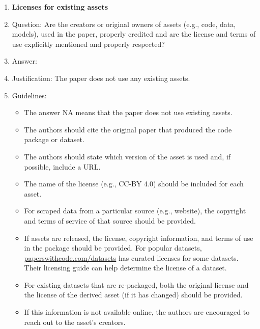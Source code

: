 \begin{enumerate}
\item {\bf Licenses for existing assets}
\item[] Question: Are the creators or original owners of assets (e.g., code, data, models), used in the paper, properly credited and are the license and terms of use explicitly mentioned and properly respected?
\item[] Answer: \answerNA{}
\item[] Justification: The paper does not use any existing assets.
\item[] Guidelines:
  \begin{itemize}
  \item The answer NA means that the paper does not use existing assets.
  \item The authors should cite the original paper that produced the code package or dataset.
  \item The authors should state which version of the asset is used and, if possible, include a URL.
  \item The name of the license (e.g., CC-BY 4.0) should be included for each asset.
  \item For scraped data from a particular source (e.g., website), the copyright and terms of service of that source should be provided.
  \item If assets are released, the license, copyright information, and terms of use in the package should be provided. For popular datasets, \url{paperswithcode.com/datasets} has curated licenses for some datasets. Their licensing guide can help determine the license of a dataset.
  \item For existing datasets that are re-packaged, both the original license and the license of the derived asset (if it has changed) should be provided.
  \item If this information is not available online, the authors are encouraged to reach out to the asset's creators.
  \end{itemize}


\end{enumerate}
